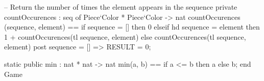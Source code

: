 \begin{vdmpp}[breaklines=true]
-- Return the number of times the element appears in the sequence
  private countOccurences : seq of Piece`Color * Piece`Color -> nat
   countOccurences (sequence, element) ==
    if sequence = [] then
     0
    elseif hd sequence = element then
     1 + countOccurences(tl sequence, element)
    else
     countOccurences(tl sequence, element)
   post sequence = [] => RESULT = 0;
   
   static public min : nat * nat -> nat
   min(a, b) ==
    if a <= b then a
    else b;
end Game
\end{vdmpp}
